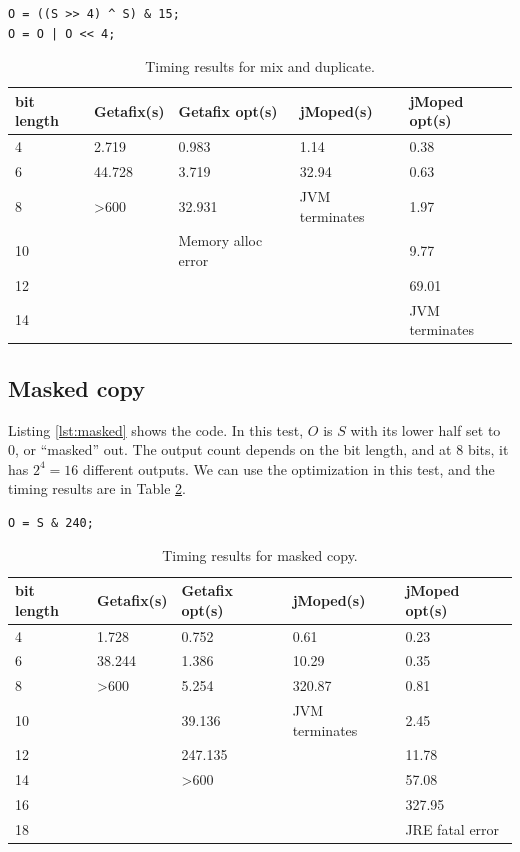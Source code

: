 \lstset{language=C}  
\begin{lstlisting}[float=!h, caption={Mix and duplicate test program at 8 bits.},label=lst:mix]
O = ((S >> 4) ^ S) & 15;
O = O | O << 4;
\end{lstlisting}
\begin{table}[htbp]
\begin{center}
\begin{tabular}{|l|l|l|l|l|}
\hline
bit length & Getafix(s) & Getafix opt(s) & jMoped(s) & jMoped opt(s) \\ \hline
4 & 2.719 & 0.983 & 1.14 & 0.38 \\ \hline
6 & 44.728 & 3.719 & 32.94 & 0.63 \\ \hline
8 & \textgreater600 & 32.931 & JVM terminates & 1.97 \\ \hline
10 &  & Memory alloc error &  & 9.77 \\ \hline
12 &  &  &  & 69.01 \\ \hline
14 &  &  &  & JVM terminates \\ \hline
\end{tabular}
\end{center}
\caption{Timing results for mix and duplicate.}
\label{tbl:mix}
\end{table}

\subsection{Masked copy}
Listing \ref{lst:masked} shows the code. In this test, $O$ is $S$ with its lower half set to $0$, or ``masked'' out. The output count depends on the bit length, and at $8$ bits, it has $2^{4} = 16$ different outputs. We can use the optimization in this test, and the timing results are in Table \ref{tbl:masked}.

\lstset{language=C}  
\begin{lstlisting}[float=!h, caption={Masked copy test program at 8 bits.},label=lst:masked]
O = S & 240;
\end{lstlisting}

\begin{table}[!h]
\begin{center}
\begin{tabular}{|l|l|l|l|l|}
\hline
bit length & Getafix(s) & Getafix opt(s) & jMoped(s) & jMoped opt(s) \\ \hline
4 & 1.728 & 0.752 & 0.61 & 0.23 \\ \hline
6 & 38.244 & 1.386 & 10.29 & 0.35 \\ \hline
8 & \textgreater600 & 5.254 & 320.87 & 0.81 \\ \hline
10 &  & 39.136 & JVM terminates & 2.45 \\ \hline
12 &  & 247.135 &  & 11.78 \\ \hline
14 &  & \textgreater600 &  & 57.08 \\ \hline
16 &  &  &  & 327.95 \\ \hline
18 &  &  &  & JRE fatal error \\ \hline
\end{tabular}
\end{center}
\caption{Timing results for masked copy.}
\label{tbl:masked}
\end{table}

